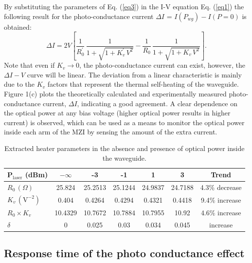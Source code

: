 By substituting the parameters of Eq. (\ref{eq3}) in the I-V equation Eq. (\ref{eq1}) the following result for the photo-conductance current $\Delta I$ = $I(P_{wg}) - I(P=0)$ is obtained:
%
\begin{equation}\label{eq4}
\Delta I = 2V \left[\frac{1}{R_0^\prime} \, \frac{1}{1+\sqrt{1+K_v^\prime \, V^2}} - \frac{1}{R_0} \, \frac{1}{1+\sqrt{1+K_v \, V^2}} \right] .
\end{equation}
%
Note that even if $K_v \rightarrow 0$, the photo-conductance current can exist, however, the $\Delta I-V$ curve will be linear. The deviation from a linear characteristic is mainly due to the $K_v$ factors that represent the thermal self-heating of the waveguide.
Figure 1(c) plots the theoretically calculated and experimentally measured photo-conductance current, $\Delta I$, indicating a good agreement. A clear dependence on the optical power at any bias voltage (higher optical power results in higher current) is observed, which can be used as a means to monitor the optical power inside each arm of the MZI by sensing the amount of the extra current.


\begin{table}[t] 
\footnotesize
\centering
\caption{Extracted heater parameters in the absence and presence of optical power inside the waveguide.}
\begin{tabular}{lccccc|c}
\hline
\textbf{P$_\text{laser}$ (dBm)} & \textbf{$-\infty$} & \textbf{-3} & \textbf{-1} & \textbf{1} & \textbf{3} & \textbf{Trend} \\ \midrule
\textbf{$R_0 \, (\Omega)$} & 25.824 & 25.2513 & 25.1244 & 24.9837 & 24.7188 & 4.3\% decrease \\ \hdashline
\textbf{$K_v \, (\textrm{V}^{-2})$} & 0.404 & 0.4264 & 0.4294 & 0.4321 & 0.4418 & 9.4\% increase \\ \hdashline
\textbf{$R_0 \times K_v$} & 10.4329 & 10.7672 & 10.7884 & 10.7955 & 10.92 & 4.6\% increase \\  \hdashline
\textbf{$\delta$} & 0 & 0.025 & 0.03 & 0.034 & 0.045 & increase \\ \bottomrule
\end{tabular}
\label{table1}
\end{table}




\subsection{Response time of the photo conductance effect}

